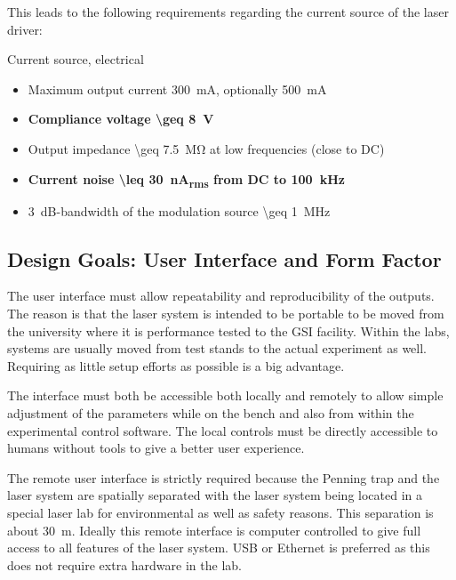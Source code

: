 This leads to the following requirements regarding the current source of the laser driver:
\begin{center}
    \begin{specifications}[label={lst:dgDrive_specs_electrical}]{Current source, electrical}
    \begin{itemize}
        \item Maximum output current \qty{300}{\mA}, optionally \qty{500}{\mA}
        \item \textbf{Compliance voltage \qty[text-series-to-math, reset-text-series = false, reset-math-version = false]{\geq 8}{\V}}
        \item Output impedance \qty{\geq 7.5}{\mega\ohm} at low frequencies (close to DC)
        \item \textbf{Current noise \qty[text-series-to-math, reset-text-series = false, reset-math-version = false]{\leq 30}{\nA_{rms}} from DC to \qty[text-series-to-math, reset-text-series = false, reset-math-version = false]{100}{\kHz}}
        \item \qty{3}{\dB}-bandwidth of the modulation source \qty{\geq 1}{\MHz}
    \end{itemize}
    \end{specifications}
\end{center}

\subsection{Design Goals: User Interface and Form Factor}
The user interface must allow repeatability and reproducibility of the outputs. The reason is that the laser system is intended to be portable to be moved from the university where it is performance tested to the GSI facility. Within the labs, systems are usually moved from test stands to the actual experiment as well. Requiring as little setup efforts as possible is a big advantage.

The interface must both be accessible both locally and remotely to allow simple adjustment of the parameters while on the bench and also from within the experimental control software. The local controls must be directly accessible to humans without tools to give a better user experience.

The remote user interface is strictly required because the Penning trap and the laser system are spatially separated with the laser system being located in a special laser lab for environmental as well as safety reasons. This separation is about \qty{30}{\meter}. Ideally this remote interface is computer controlled to give full access to all features of the laser system. USB or Ethernet is preferred as this does not require extra hardware in the lab.

